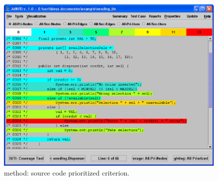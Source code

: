 \begin{figure}[!ht]
\begin{center}
\includegraphics[height=0.40\textheight]{fig/dispenser-source}
\caption{\label{fig:dispenser-source} 
method: source code prioritized \wrt {}
criterion.}
\end{center}
\end{figure}
